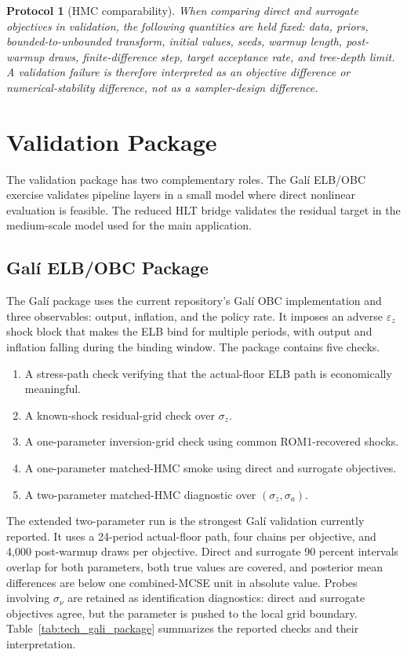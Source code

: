 \documentclass[12pt]{article}
\newcommand{\eps}{\varepsilon}
\newtheorem{protocol}{Protocol}
\begin{document}
\begin{protocol}[HMC comparability]
When comparing direct and surrogate objectives in validation, the following
quantities are held fixed: data, priors, bounded-to-unbounded transform,
initial values, seeds, warmup length, post-warmup draws, finite-difference step,
target acceptance rate, and tree-depth limit. A validation failure is therefore
interpreted as an objective difference or numerical-stability difference, not as
a sampler-design difference.
\end{protocol}

\section{Validation Package}
\label{apptech:validation_package}

The validation package has two complementary roles. The Gal\'i ELB/OBC
exercise validates pipeline layers in a small model where direct nonlinear
evaluation is feasible. The reduced HLT bridge validates the residual target in
the medium-scale model used for the main application.

\subsection{Gal\'i ELB/OBC Package}

The Gal\'i package uses the current repository's Gal\'i OBC implementation and
three observables: output, inflation, and the policy rate. It imposes an
adverse \(\eps_z\) shock block that makes the ELB bind for multiple periods,
with output and inflation falling during the binding window. The package
contains five checks.

\begin{enumerate}[leftmargin=2em,itemsep=0.2em]
\item A stress-path check verifying that the actual-floor ELB path is economically
      meaningful.
\item A known-shock residual-grid check over \(\sigma_z\).
\item A one-parameter inversion-grid check using common ROM1-recovered shocks.
\item A one-parameter matched-HMC smoke using direct and surrogate objectives.
\item A two-parameter matched-HMC diagnostic over \((\sigma_z,\sigma_a)\).
\end{enumerate}

The extended two-parameter run is the strongest Gal\'i validation currently
reported. It uses a 24-period actual-floor path, four chains per objective, and
4,000 post-warmup draws per objective. Direct and surrogate 90 percent
intervals overlap for both parameters, both true values are covered, and
posterior mean differences are below one combined-MCSE unit in absolute value.
Probes involving \(\sigma_\nu\) are retained as identification diagnostics:
direct and surrogate objectives agree, but the parameter is pushed to the local
grid boundary. Table~\ref{tab:tech_gali_package} summarizes the reported
checks and their interpretation.
\end{document}

